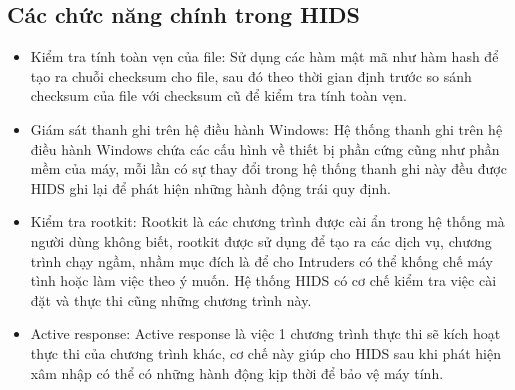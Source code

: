 \subsection{Các chức năng chính trong HIDS}
  \begin{itemize}
    \item Kiểm tra tính toàn vẹn của file: Sử dụng các hàm mật mã như hàm hash
    để tạo ra chuỗi checksum cho file, sau đó theo thời gian định trước so sánh checksum của file với checksum cũ để kiểm tra tính toàn vẹn.
    \item Giám sát thanh ghi trên hệ điều hành Windows:
Hệ thống thanh ghi trên hệ điều hành Windows chứa các cấu hình về thiết bị phần cứng cũng như phần mềm của máy, mỗi lần có sự thay đổi trong hệ thống thanh ghi này đều được HIDS ghi lại để phát hiện những hành động trái quy định.
    \item Kiểm tra rootkit:
Rootkit là các chương trình được cài ẩn trong hệ thống mà người dùng không biết, rootkit được sử dụng để tạo ra các dịch vụ, chương trình chạy ngầm, nhầm mục đích là để cho Intruders có thể khống chế máy tình hoặc làm việc theo ý muốn.
Hệ thống HIDS có cơ chế kiểm tra việc cài đặt và thực thi cũng những chương trình này.
    \item Active response:
Active response là việc 1 chương trình thực thi sẽ kích hoạt thực thi của chương trình khác, cơ chế này giúp cho HIDS sau khi phát hiện xâm nhập có thể có những hành động kịp thời để bảo vệ máy tính.
  \end{itemize}